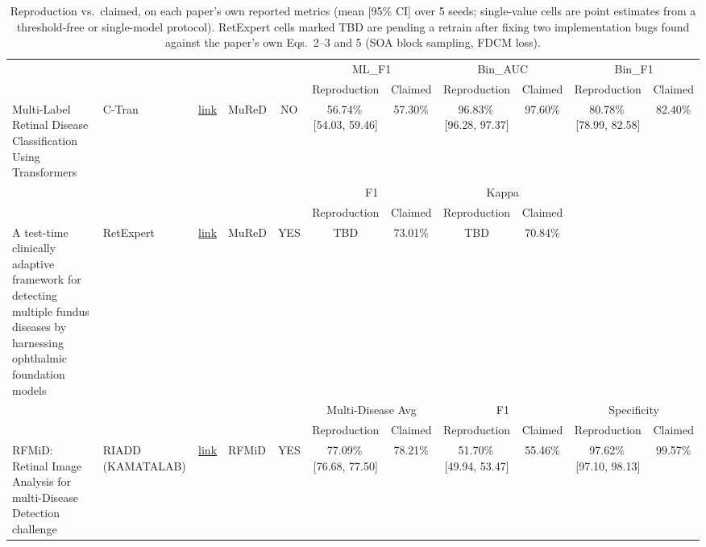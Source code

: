 \begin{table}[t]
\centering
\caption{Reproduction vs.\ claimed, on each paper's own reported metrics (mean [95\% CI] over 5 seeds; single-value cells are point estimates from a threshold-free or single-model protocol). RetExpert cells marked TBD are pending a retrain after fixing two implementation bugs found against the paper's own Eqs.\ 2--3 and 5 (SOA block sampling, FDCM loss).}
\label{tab:reproduction}
\begin{tabular}{llllccccccc}
\toprule
 & & & & & \multicolumn{2}{c}{ML\_F1} & \multicolumn{2}{c}{Bin\_AUC} & \multicolumn{2}{c}{Bin\_F1} \\
\cmidrule(lr){6-7} \cmidrule(lr){8-9} \cmidrule(lr){10-11}
 & & & & & Reproduction & Claimed & Reproduction & Claimed & Reproduction & Claimed \\
\midrule
Multi-Label Retinal Disease Classification Using Transformers & C-Tran & \href{https://github.com/QData/C-Tran}{link} & MuReD & NO & 56.74\%\,[54.03, 59.46] & 57.30\% & 96.83\%\,[96.28, 97.37] & 97.60\% & 80.78\%\,[78.99, 82.58] & 82.40\% \\
\midrule
 & & & & & \multicolumn{2}{c}{F1} & \multicolumn{2}{c}{Kappa} & \multicolumn{2}{c}{} \\
\cmidrule(lr){6-7} \cmidrule(lr){8-9}
 & & & & & Reproduction & Claimed & Reproduction & Claimed & & \\
\midrule
A test-time clinically adaptive framework for detecting multiple fundus diseases by harnessing ophthalmic foundation models & RetExpert & \href{https://github.com/OVS-AILab/RetExpert}{link} & MuReD & YES & TBD & 73.01\% & TBD & 70.84\% & & \\
\midrule
 & & & & & \multicolumn{2}{c}{Multi-Disease Avg} & \multicolumn{2}{c}{F1} & \multicolumn{2}{c}{Specificity} \\
\cmidrule(lr){6-7} \cmidrule(lr){8-9} \cmidrule(lr){10-11}
 & & & & & Reproduction & Claimed & Reproduction & Claimed & Reproduction & Claimed \\
\midrule
RFMiD: Retinal Image Analysis for multi-Disease Detection challenge & RIADD (KAMATALAB) & \href{https://github.com/Hanson0910/Pytorch-RIADD}{link} & RFMiD & YES & 77.09\%\,[76.68, 77.50] & 78.21\% & 51.70\%\,[49.94, 53.47] & 55.46\% & 97.62\%\,[97.10, 98.13] & 99.57\% \\
\bottomrule
\end{tabular}
\end{table}
